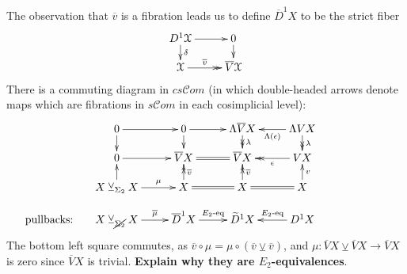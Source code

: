 \documentclass[11pt]{amsart}
\theoremstyle{plain}
\theoremstyle{definition}
\renewcommand{\to}{\longrightarrow}
\newcommand{\scrC}{\mathscr{C}}
\newcommand{\calX}{\mathcal{X}}
\theoremstyle{plain}
\newcommand{\algs}{{\scrC\!\textit{om}}}
\newcommand{\smashcoprod}{\veebar}%
\begin{document}
\begin{Operations on the Bousfield-Kan spectral sequence}
The observation that $\overline{v}$ is a fibration leads us to define $\overline{D}^1X$ to be the strict fiber
\[\xymatrix@R=4mm{
D^1\calX \ar[r]
\ar[d]^-{\delta}
&%
0\ar[d]\\
\calX \ar@{->>}[r]^-{\overline{v}}
&%
\overline{V}\calX %
}\]
There is a commuting diagram in $cs\algs$ (in which double-headed arrows denote maps which are fibrations in $s\algs$ in each cosimplicial level):
\[\xymatrix@R=4mm{
0\ar[r]\ar[d]
&%
0\ar[d]
\ar[r]
&%
\Lambda \overline{V}X\ar@{->>}[d]^-{\lambda}
&%
\Lambda VX\ar[l]^-{\Lambda(\epsilon)}
\ar@{->>}[d]^-{\lambda}
\\%
0\ar[r]
&%
\overline{V}X\ar@{=}[r]
&%
\overline{V}X&%
VX\ar@{->>}[l]^-{\epsilon}
\\%
X\smashcoprod_{\Sigma_2} X\ar[r]^-{\mu}\ar[u]
&%
X\ar@{->>}[u]_-{\overline{v}}
\ar@{=}[r]
&%
X\ar@{->>}[u]_-{\overline{v}}&%
X\ar[u]_-{v}\ar@{=}[l]%
\\
\makebox[0cm][r]{pullbacks:\qquad}X\smashcoprod_{\cancel{\Sigma_2}} X\ar[r]^-{\overline{\mu}}
&
\overline{D}^1X\ar[r]^-{\textup{$E_2$-eq}}
&
\smash{\widetilde{D}^1X}&
\ar[l]_-{\textup{$E_2$-eq}}
D^1X
}\]
The bottom left square commutes, as $\overline{v}\circ\mu=\mu\circ(\overline{v}\smashcoprod\overline{v})$, and 
$\mu:\overline{V}X\smashcoprod \overline{V}X\to \overline{V}X$ is  zero since $\overline{V}X$ is trivial. \textbf{Explain why they are $E_2$-equivalences}.


\end{Operations on the Bousfield-Kan spectral sequence}
\end{document}
